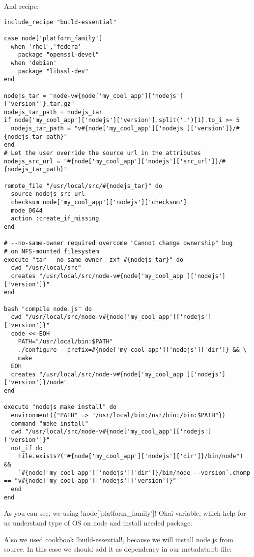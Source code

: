 And recipe:

\begin{lstlisting}[label=lst:cookbook-ohai-recipe-before,title=my-server-cloud/site-cookbooks/my\_cool\_app/recipes/node.rb]
include_recipe "build-essential"

case node['platform_family']
  when 'rhel','fedora'
    package "openssl-devel"
  when 'debian'
    package "libssl-dev"
end

nodejs_tar = "node-v#{node['my_cool_app']['nodejs']['version']}.tar.gz"
nodejs_tar_path = nodejs_tar
if node['my_cool_app']['nodejs']['version'].split('.')[1].to_i >= 5
  nodejs_tar_path = "v#{node['my_cool_app']['nodejs']['version']}/#{nodejs_tar_path}"
end
# Let the user override the source url in the attributes
nodejs_src_url = "#{node['my_cool_app']['nodejs']['src_url']}/#{nodejs_tar_path}"

remote_file "/usr/local/src/#{nodejs_tar}" do
  source nodejs_src_url
  checksum node['my_cool_app']['nodejs']['checksum']
  mode 0644
  action :create_if_missing
end

# --no-same-owner required overcome "Cannot change ownership" bug
# on NFS-mounted filesystem
execute "tar --no-same-owner -zxf #{nodejs_tar}" do
  cwd "/usr/local/src"
  creates "/usr/local/src/node-v#{node['my_cool_app']['nodejs']['version']}"
end

bash "compile node.js" do
  cwd "/usr/local/src/node-v#{node['my_cool_app']['nodejs']['version']}"
  code <<-EOH
    PATH="/usr/local/bin:$PATH"
    ./configure --prefix=#{node['my_cool_app']['nodejs']['dir']} && \
    make
  EOH
  creates "/usr/local/src/node-v#{node['my_cool_app']['nodejs']['version']}/node"
end

execute "nodejs make install" do
  environment({"PATH" => "/usr/local/bin:/usr/bin:/bin:$PATH"})
  command "make install"
  cwd "/usr/local/src/node-v#{node['my_cool_app']['nodejs']['version']}"
  not_if do
    File.exists?("#{node['my_cool_app']['nodejs']['dir']}/bin/node") &&
    `#{node['my_cool_app']['nodejs']['dir']}/bin/node --version`.chomp == "v#{node['my_cool_app']['nodejs']['version']}"
  end
end
\end{lstlisting}

As you can see, we using \inline!node['platform_family']! Ohai variable, which help for us understand type of OS on node and install needed package.

Also we used cookbook \inline!build-essential!, because we will install node.js from source. In this case we should add it as dependency in our metadata.rb file:

